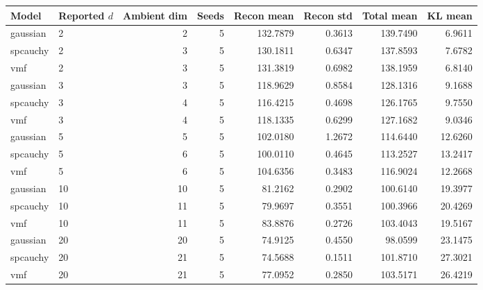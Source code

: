 \begin{tabular}{llrrrrrr}
\toprule
Model & Reported $d$ & Ambient dim & Seeds & Recon mean & Recon std & Total mean & KL mean \\
\midrule
gaussian & 2 & 2 & 5 & 132.7879 & 0.3613 & 139.7490 & 6.9611 \\
spcauchy & 2 & 3 & 5 & 130.1811 & 0.6347 & 137.8593 & 7.6782 \\
vmf & 2 & 3 & 5 & 131.3819 & 0.6982 & 138.1959 & 6.8140 \\
gaussian & 3 & 3 & 5 & 118.9629 & 0.8584 & 128.1316 & 9.1688 \\
spcauchy & 3 & 4 & 5 & 116.4215 & 0.4698 & 126.1765 & 9.7550 \\
vmf & 3 & 4 & 5 & 118.1335 & 0.6299 & 127.1682 & 9.0346 \\
gaussian & 5 & 5 & 5 & 102.0180 & 1.2672 & 114.6440 & 12.6260 \\
spcauchy & 5 & 6 & 5 & 100.0110 & 0.4645 & 113.2527 & 13.2417 \\
vmf & 5 & 6 & 5 & 104.6356 & 0.3483 & 116.9024 & 12.2668 \\
gaussian & 10 & 10 & 5 & 81.2162 & 0.2902 & 100.6140 & 19.3977 \\
spcauchy & 10 & 11 & 5 & 79.9697 & 0.3551 & 100.3966 & 20.4269 \\
vmf & 10 & 11 & 5 & 83.8876 & 0.2726 & 103.4043 & 19.5167 \\
gaussian & 20 & 20 & 5 & 74.9125 & 0.4550 & 98.0599 & 23.1475 \\
spcauchy & 20 & 21 & 5 & 74.5688 & 0.1511 & 101.8710 & 27.3021 \\
vmf & 20 & 21 & 5 & 77.0952 & 0.2850 & 103.5171 & 26.4219 \\
\bottomrule
\end{tabular}